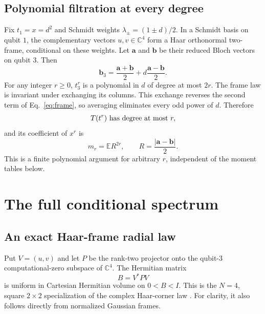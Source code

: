 \documentclass[aps,pra,reprint,amsmath,amssymb,longbibliography]{revtex4-2}
\newcommand{\C}{\mathbb C}
\newcommand{\E}{\mathbb E}
\begin{document}
\subsection{Polynomial filtration at every degree}

Fix $t_1=x=d^2$ and Schmidt weights $\lambda_\pm=(1\pm d)/2$. In a Schmidt basis on qubit $1$, the complementary vectors $u,v\in\C^4$ form a Haar orthonormal two-frame, conditional on these weights. Let $\bm a$ and $\bm b$ be their reduced Bloch vectors on qubit $3$. Then
\begin{equation}
 \bm b_3=\frac{\bm a+\bm b}{2}
              +d\frac{\bm a-\bm b}{2}.
\label{eq:frame}
\end{equation}
For any integer $r\geq0$, $t_3^r$ is a polynomial in $d$ of degree at most $2r$. The frame law is invariant under exchanging its columns. This exchange reverses the second term of Eq.~\eqref{eq:frame}, so averaging eliminates every odd power of $d$. Therefore
\begin{equation}
 T(t^r)\ \hbox{has degree at most }r,
\end{equation}
and its coefficient of $x^r$ is
\begin{equation}
 m_r=\E R^{2r},\qquad R=\frac{|\bm a-\bm b|}{2}.
\label{eq:leading}
\end{equation}
This is a finite polynomial argument for arbitrary $r$, independent of the moment tables below.

\section{The full conditional spectrum}
\label{sec:conditional}

\subsection{An exact Haar-frame radial law}

Put $V=(u,v)$ and let $P$ be the rank-two projector onto the qubit-$3$ computational-zero subspace of $\C^4$. The Hermitian matrix
\begin{equation}
 B=V^*PV
\end{equation}
is uniform in Cartesian Hermitian volume on $0<B<I$. This is the $N=4$, square $2\times2$ specialization of the complex Haar-corner law \cite{Fyodorov2007}. For clarity, it also follows directly from normalized Gaussian frames.
\end{document}

